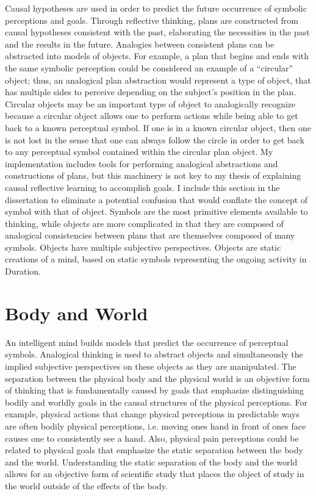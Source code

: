 Causal hypotheses are used in order to predict the future occurrence
of symbolic perceptions and goals.  Through reflective thinking, plans
are constructed from causal hypotheses consistent with the past,
elaborating the necessities in the past and the results in the future.
Analogies between consistent plans can be abstracted into models of
objects.  For example, a plan that begins and ends with the same
symbolic perception could be considered an example of a ``circular''
object; thus, an analogical plan abstraction would represent a type of
object, that has multiple sides to perceive depending on the subject's
position in the plan.  Circular objects may be an important type of
object to analogically recognize because a circular object allows one
to perform actions while being able to get back to a known perceptual
symbol.  If one is in a known circular object, then one is not lost in
the sense that one can always follow the circle in order to get back
to any perceptual symbol contained within the circular plan object.
My implementation includes tools for performing analogical
abstractions and constructions of plans, but this machinery is not key
to my thesis of explaining causal reflective learning to accomplish
goals.  I include this section in the dissertation to eliminate a
potential confusion that would conflate the concept of symbol with
that of object.  Symbols are the most primitive elements available to
thinking, while objects are more complicated in that they are composed
of analogical consistencies between plans that are themselves composed
of many symbols.  Objects have multiple subjective perspectives.
Objects are static creations of a mind, based on static symbols
representing the ongoing activity in Duration.

\section{Body and World}

An intelligent mind builds models that predict the occurrence of
perceptual symbols.  Analogical thinking is used to abstract objects
and simultaneously the implied subjective perspectives on these
objects as they are manipulated.  The separation between the physical
body and the physical world is an objective form of thinking that is
fundamentally caused by goals that emphasize distinguishing bodily and
worldly goals in the causal structures of the physical perceptions.
For example, physical actions that change physical perceptions in
predictable ways are often bodily physical perceptions, i.e. moving
ones hand in front of ones face causes one to consistently see a hand.
Also, physical pain perceptions could be related to physical goals
that emphasize the static separation between the body and the world.
Understanding the static separation of the body and the world allows
for an objective form of scientific study that places the object of
study in the world outside of the effects of the body.

